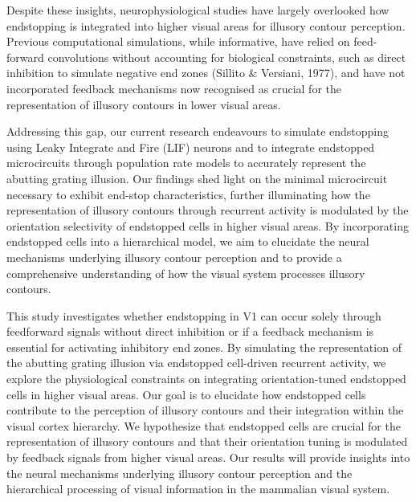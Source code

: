 \documentclass[12pt]{article}
\begin{document}
Despite these insights, neurophysiological studies have largely overlooked how endstopping is integrated into higher visual areas for illusory contour perception. Previous computational simulations, while informative, have relied on feed-forward convolutions without accounting for biological constraints, such as direct inhibition to simulate negative end zones (Sillito \& Versiani, 1977), and have not incorporated feedback mechanisms now recognised as crucial for the representation of illusory contours in lower visual areas.

Addressing this gap, our current research endeavours to simulate endstopping using Leaky Integrate and Fire (LIF) neurons and to integrate endstopped microcircuits through population rate models to accurately represent the abutting grating illusion. Our findings shed light on the minimal microcircuit necessary to exhibit end-stop characteristics, further illuminating how the representation of illusory contours through recurrent activity is modulated by the orientation selectivity of endstopped cells in higher visual areas. By incorporating endstopped cells into a hierarchical model, we aim to elucidate the neural mechanisms underlying illusory contour perception and to provide a comprehensive understanding of how the visual system processes illusory contours.

This study investigates whether endstopping in V1 can occur solely through feedforward signals without direct inhibition or if a feedback mechanism is essential for activating inhibitory end zones. By simulating the representation of the abutting grating illusion via endstopped cell-driven recurrent activity, we explore the physiological constraints on integrating orientation-tuned endstopped cells in higher visual areas. Our goal is to elucidate how endstopped cells contribute to the perception of illusory contours and their integration within the visual cortex hierarchy. We hypothesize that endstopped cells are crucial for the representation of illusory contours and that their orientation tuning is modulated by feedback signals from higher visual areas. Our results will provide insights into the neural mechanisms underlying illusory contour perception and the hierarchical processing of visual information in the mammalian visual system.




\end{document}
